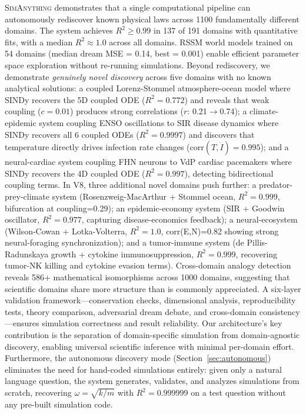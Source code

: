 \documentclass{article}
\newcommand{\ours}{\textsc{SimAnything}}
\begin{document}
\ours{} demonstrates that a single computational pipeline can autonomously
rediscover known physical laws across 1100 fundamentally different domains.
The system achieves $R^2 \geq 0.99$ in 137 of 191 domains with quantitative
fits, with a median $R^2 \approx 1.0$ across all domains. RSSM world models
trained on 54 domains (median dream MSE = 0.14, best = 0.001) enable
efficient parameter space exploration without re-running simulations.
Beyond rediscovery, we demonstrate \emph{genuinely novel discovery} across
five domains with no known analytical solutions: a coupled Lorenz-Stommel
atmosphere-ocean model where SINDy recovers the 5D coupled ODE ($R^2=0.772$)
and reveals that weak coupling ($c=0.01$) produces strong correlations
($r$: 0.21$\to$0.74); a climate-epidemic system coupling ENSO oscillations to
SIR disease dynamics where SINDy recovers all 6 coupled ODEs ($R^2=0.9997$)
and discovers that temperature directly drives infection rate changes
(corr$(T, \dot{I})=0.995$); and a neural-cardiac system coupling FHN neurons
to VdP cardiac pacemakers where SINDy recovers the 4D coupled ODE ($R^2=0.997$),
detecting bidirectional coupling terms. In V8, three additional novel domains
push further: a predator-prey-climate system (Rosenzweig-MacArthur + Stommel
ocean, $R^2=0.999$, bifurcation at coupling=0.29); an epidemic-economy system
(SIR + Goodwin oscillator, $R^2=0.977$, capturing disease-economics feedback);
a neural-ecosystem (Wilson-Cowan + Lotka-Volterra, $R^2=1.0$,
corr(E,N)=0.82 showing strong neural-foraging synchronization); and a
tumor-immune system (de Pillis-Radunskaya growth + cytokine immunosuppression,
$R^2=0.999$, recovering tumor-NK killing and cytokine evasion terms).
Cross-domain analogy detection reveals
586+ mathematical isomorphisms across 1000 domains, suggesting that scientific
domains share more structure than is commonly appreciated. A six-layer
validation framework---conservation checks, dimensional analysis,
reproducibility tests, theory comparison, adversarial dream debate, and
cross-domain consistency---ensures simulation correctness and result
reliability. Our architecture's key contribution is the separation of
domain-specific simulation from domain-agnostic discovery, enabling
universal scientific inference with minimal per-domain effort. Furthermore, the autonomous discovery mode (Section~\ref{sec:autonomous})
eliminates the need for hand-coded simulations entirely: given only a
natural language question, the system generates, validates, and analyzes
simulations from scratch, recovering $\omega = \sqrt{k/m}$ with
$R^2 = 0.999999$ on a test question without any pre-built simulation code.
\end{document}
